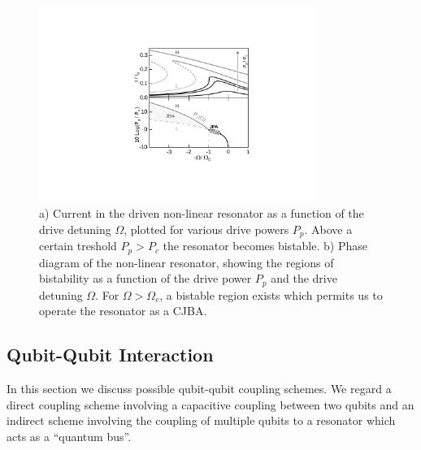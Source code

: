 %
%
 
\begin{figure}	
	\includegraphics[width=9cm]{"./material/figures/introduction/jba_phasediagram"}
	\caption{a) Current in the driven non-linear resonator as a function of the drive detuning $\Omega$, plotted for various drive powers $P_p$. Above a certain treshold $P_p>P_c$ the resonator becomes bistable. b) Phase diagram of the non-linear resonator, showing the regions of bistability as a function of the drive power $P_p$ and the drive detuning $\Omega$. For $\Omega>\Omega_c$, a bistable region exists which permits us to operate the resonator as a CJBA.}
	\label{fig:jba_curves}
\end{figure}


\subsection{Qubit-Qubit Interaction}

In this section we discuss possible qubit-qubit coupling schemes. We regard a direct coupling scheme involving a capacitive coupling between two qubits and an indirect scheme involving the coupling of multiple qubits to a resonator which acts as a ``quantum bus''.

